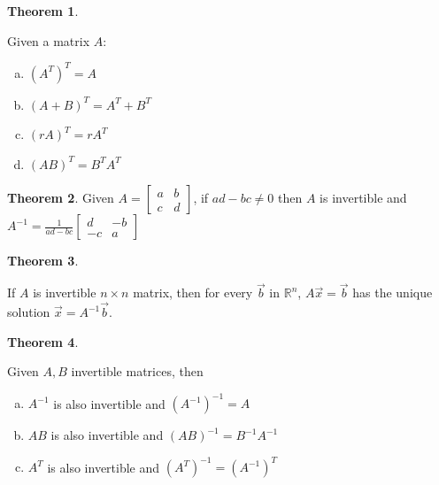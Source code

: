 \documentclass[a4paper,12pt]{article}
\theoremstyle{definition}
\newtheorem{theorem}{Theorem}
\theoremstyle{definition}
\newcommand{\mateq}[3]{#1#2 = #3}
\newcommand{\mateqaxb}{\mateq{A}{\vec{x}}{\vec{b}}}
\begin{document}
	\begin{theorem}
		\label{thm:mat-transpose-props}
		
		Given a matrix $A$:
		\begin{enumerate}[a.]
			\item $(A^T)^T = A$
			\item $(A + B)^T = A^T + B^T$
			\item $(rA)^T = rA^T$
			\item $(AB)^T = B^TA^T$
		\end{enumerate}
	\end{theorem}
	
	\begin{theorem}
		\label{thm:two-by-two-mat-invert-thm}
		Given $A
		=
		\begin{bmatrix}
			a & b\\
			c & d
		\end{bmatrix}$,
		if $ad - bc \neq 0$ then $A$ is invertible and $A^{-1} = \frac{1}{ad-bc}
		\begin{bmatrix}
			d & -b\\
			-c & a
		\end{bmatrix}$
	\end{theorem}
	
	\begin{theorem}
		\label{thm:invert-mat-unique-soln-thm}
		
		If $A$ is invertible $n \times n$ matrix, then for every $\vec{b}$ in $\mathbb{R}^n$, $\mateqaxb$ has the unique solution $\vec{x} = A^{-1}\vec{b}$.
	\end{theorem}
	
	\begin{theorem}
		\label{thm:invert-mat-algebra}
		
		Given $A, B$ invertible matrices, then
		\begin{enumerate}[a.]
			\item $A^{-1}$ is also invertible and $(A^{-1})^{-1} = A$
			
			\item $AB$ is also invertible and $(AB)^{-1} = B^{-1}A^{-1}$
			
			\item $A^T$ is also invertible and $(A^T)^{-1} = (A^{-1})^T$
		\end{enumerate}
	\end{theorem}
	
\end{document}
